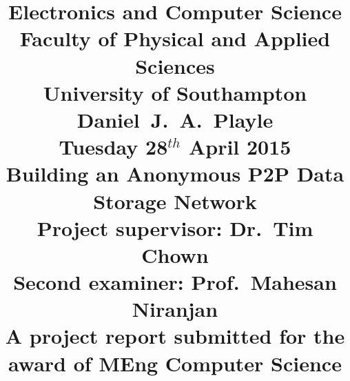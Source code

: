\title{ \vspace{-1.0cm}
	Electronics and Computer Science\\
	Faculty of Physical and Applied Sciences\\
	University of Southampton\\
	\vspace{2.5cm}
	Daniel~J.~A.~Playle\\
	\vspace{1.0cm}
	Tuesday 28$^{th}$ April 2015\\
	\vspace{1.5cm}
	\textbf{Building an Anonymous P2P Data Storage Network}\\
	\vspace{2.5cm}
	Project supervisor: Dr.~Tim Chown\\
	Second examiner: Prof.~Mahesan Niranjan\\
	\vspace{1.5cm}
	A project report submitted for the award of MEng Computer Science\vspace{-3.0cm}}
\author{}
\date{}
\maketitle